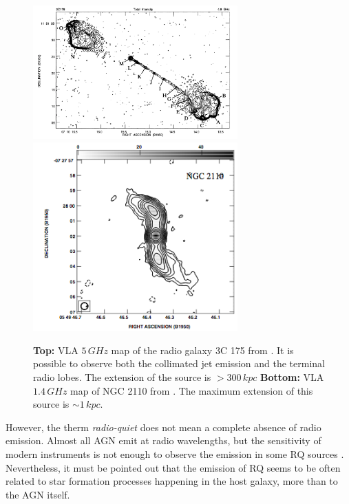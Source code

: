 \documentclass[../thesis.tex]{subfiles}
\begin{document}
\begin{figure}
\centering
\includegraphics[width=0.7\textwidth]{images/3c175.png} \\
\includegraphics[width=0.7\textwidth]{images/NGC2110.png}
\caption[]{\textbf{Top:} VLA $5\,\si{GHz}$ map of the radio galaxy 3C 175 from \citet{Bridle94}. It is possible to observe both the collimated jet emission and the terminal radio lobes. The extension of the source is $> 300\,\si{kpc}$ \textbf{Bottom:} VLA $1.4\,\si{GHz}$ map of NGC 2110 from \citet{Mundell09}. The maximum extension of this source is $\sim 1\,\si{kpc}$. }
\label{fig:radio_galaxies}
\end{figure}

However, the therm \emph{radio-quiet} does not mean a complete absence of radio emission.
Almost all AGN emit at radio wavelengths, but the sensitivity of modern instruments is not enough to observe the emission in some RQ sources \citep{Kellermann16}.
Nevertheless, it must be pointed out that the emission of RQ seems to be often related to star formation processes happening in the host galaxy, more than to the AGN itself.
\end{document}
